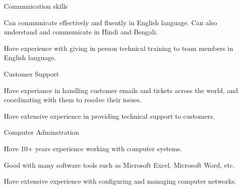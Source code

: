 

\begin{cventries}

  \cventry
    {} %
    {Communication skills} %
    {} %
    {} %
    {
      \begin{cvitems} %
        \item {Can communicate effectively and fluently in English language. Can also understand and communicate in Hindi and Bengali.}
        \item {Have experience with giving in person technical training to team members in English language.}
      \end{cvitems}
    }

  \cventry
    {} %
    {Customer Support} %
    {} %
    {} %
    {
      \begin{cvitems} %
        \item {Have experiance in handling customer emails and tickets across the world, and coordinating with them to resolve their issues.}
        \item {Have extensive experience in providing technical support to customers.}
      \end{cvitems}
    }

\cventry
{} %
{Computer Adminstration} %
{} %
{} %
{
	\begin{cvitems} %
		\item { Have 10+ years experience working with computer systems. }
		\item { Good with many software tools such as Microsoft Excel, Microsoft Word, etc.}
		\item { Have extensive experience with configuring and managing computer networks.}
	\end{cvitems}
}


\end{cventries}
